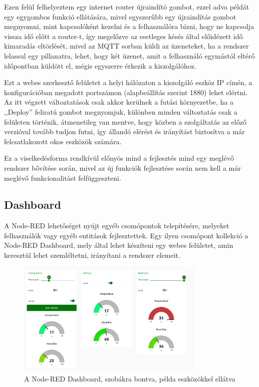 \documentclass[]{thesis-ekf}
\theoremstyle{definition}
\theoremstyle{remark}
\begin{document}
Ezen felül felhelyeztem egy internet router újraindító gombot, ezzel adva példát egy egygombos funkció ellátására, mivel egyszerűbb egy újraindítás gombot megnyomni, 
mint kapcsolóként kezelni és a felhasználóra bízni, hogy ne kapcsolja vissza idő előtt a router-t, így megelőzve az esetleges 
késés által előidézett idő kimaradás eltörlését, mivel az MQTT sorban küldi az üzeneteket, ha a rendszer lelassul egy pillanatra, 
lehet, hogy két üzenet, amit a felhasználó egymástól eltérő időpontban küldött el, mégis egyszerre érkezik a kiszolgálóhoz.

Ezt a webes szerkesztő felületet a helyi hálózaton a kiszolgáló eszköz IP címén, a konfigurációban megadott portszámon (alapbeállítás szerint 1880) lehet elértni.
Az itt végzett változtatások csak akkor kerülnek a futási környezetbe, ha a ,,Deploy'' feliratú gombot megnyomjuk, különben minden változtatás
csak a felületen történik, átmenetileg van mentve, hogy közben a szolgáltatás az előző verzióval tovább tudjon futni, így
állandó elérést és irányítást biztosítva a már felcsatlakozott okos eszközök számára.

Ez a viselkedésforma
rendkívül előnyös mind a fejlesztés mind egy meglévő rendszer bővítése során, mivel az új funkciók
fejlesztése során nem kell a már meglévő funkcionalitást felfüggeszteni.

\subsection{Dashboard}
A Node-RED lehetőséget nyújt egyéb csomópontok telepítésére, melyeket felhasználók vagy egyéb entitások fejlesztettek. 
Egy ilyen csomópont kollekció a Node-RED Dashboard\cite{dashboard}, mely által lehet készíteni egy webes felületet, amin keresztül lehet szemléltetni, irányítani a rendszer elemeit. 
\begin{figure}[ht]
	\centering
	\includegraphics[width=0.8\textwidth]{images/dashboard.jpg}
	\caption{A Node-RED Dashboard, szobákra bontva, példa eszközökkel ellátva}
\end{figure}
\end{document}

